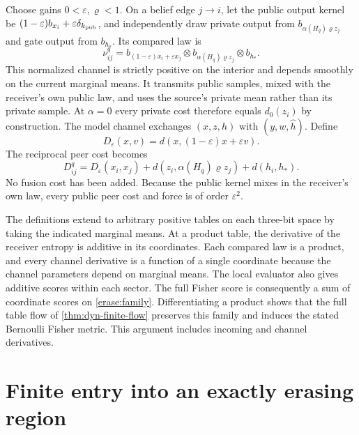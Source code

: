 Choose gains $0<\varepsilon,\varrho<1$. On a belief edge $j\to i$, let the public output kernel be $(1-\varepsilon)b_{x_i}+\varepsilon\delta_{k_{\rm pub}}$, and independently draw private output from $b_{\alpha(H_q)\varrho z_j}$ and gate output from $b_{h_*}$. Its compared law is
\begin{equation}
 \nu_{ij}^q=b_{(1-\varepsilon)x_i+\varepsilon x_j}
              \otimes b_{\alpha(H_q)\varrho z_j}\otimes b_{h_*}.
 \label{erase:compared-law}
\end{equation}
This normalized channel is strictly positive on the interior and depends smoothly on the current marginal means. It transmits public samples, mixed with the receiver's own public law, and uses the source's private mean rather than its private sample. At $\alpha=0$ every private cost therefore equals $d_0(z_i)$ by construction. The model channel exchanges $(x,z,h)$ with $(y,w,\widehat h)$. Define
\begin{equation}
 D_\varepsilon(x,v)=d(x,(1-\varepsilon)x+\varepsilon v).
\end{equation}
The reciprocal peer cost becomes
\begin{equation}
 D_{ij}^q=D_\varepsilon(x_i,x_j)
       +d(z_i,\alpha(H_q)\varrho z_j)+d(h_i,h_*).
 \label{erase:peer-cost}
\end{equation}
No fusion cost has been added. Because the public kernel mixes in the receiver's own law, every public peer cost and force is of order $\varepsilon^2$.

The definitions extend to arbitrary positive tables on each three-bit space by taking the indicated marginal means. At a product table, the derivative of the receiver entropy is additive in its coordinates. Each compared law is a product, and every channel derivative is a function of a single coordinate because the channel parameters depend on marginal means. The local evaluator also gives additive scores within each sector. The full Fisher score is consequently a sum of coordinate scores on \cref{erase:family}. Differentiating a product shows that the full table flow of \cref{thm:dyn-finite-flow} preserves this family and induces the stated Bernoulli Fisher metric. This argument includes incoming and channel derivatives.

\section{Finite entry into an exactly erasing region}

